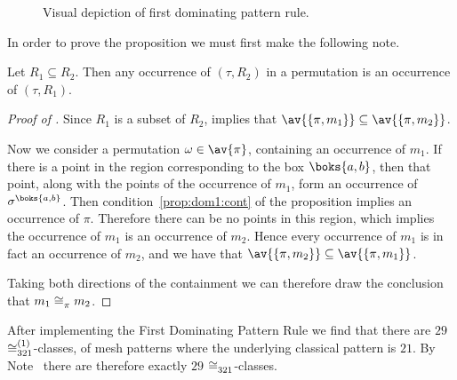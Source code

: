 \begin{figure}[htb]
    \begin{center}
        \raisebox{2ex}{\(\mapsto\)}

        \caption{Visual depiction of first dominating pattern rule.}
        \label{fig:rule1}
    \end{center}
\end{figure}

In order to prove the proposition we must first make the following note.

\begin{note}
    \label{not:downcmesh}
    Let \(R_1 \subseteq R_2\). Then any occurrence of \((\tau, R_2)\) in a permutation
    is an occurrence of \((\tau,R_1)\).
\end{note}

\begin{proof}[Proof of ]
    Since \(R_1\) is a subset of \(R_2\),  implies that
    \(\av{\{\pi,m_1\}} \subseteq \av{\{\pi,m_2\}}\).

    Now we consider a permutation \(\omega \in \av{\pi}\),
    containing an occurrence of \(m_1\). If there is a point in the
    region corresponding to the box \(\boks{a,b}\), then that point, along with the
    points of the occurrence of \(m_1\), form an occurrence of \(\sigma^\boks{a,b}\).
    Then condition~\eqref{prop:dom1:cont} of the
    proposition implies an occurrence of \(\pi\). Therefore there can be no
    points in this region, which implies the occurrence of \(m_1\) is an occurrence of \(m_2\). Hence every occurrence of
    \(m_1\) is in fact an occurrence of \(m_2\), and we have that
    \(\av{\{\pi,m_2\}} \subseteq \av{\{\pi,m_1\}}\).

    Taking both directions of the containment we can therefore draw the
    conclusion that \(m_1 \coinc{\pi} m_2\).
\end{proof}

After implementing the First Dominating Pattern Rule we find that there are
\(29\) \(\coinc[(1)]{321}\)-classes, of mesh patterns where the underlying
classical pattern is \(21\). By Note~ there are
therefore exactly \(29\) \(\coinc{321}\)-classes.

